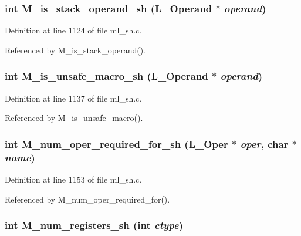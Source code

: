 \subsubsection{\setlength{\rightskip}{0pt plus 5cm}int M\_\-is\_\-stack\_\-operand\_\-sh (L\_\-Operand $\ast$ {\em operand})}\label{ml__sh_8c_88ed83827378c9bba80cda3d07304db6}




Definition at line 1124 of file ml\_\-sh.c.

Referenced by M\_\-is\_\-stack\_\-operand().
\subsubsection{\setlength{\rightskip}{0pt plus 5cm}int M\_\-is\_\-unsafe\_\-macro\_\-sh (L\_\-Operand $\ast$ {\em operand})}\label{ml__sh_8c_f997d65c0a0b45cbdd7b4cdd8093bc8c}




Definition at line 1137 of file ml\_\-sh.c.

Referenced by M\_\-is\_\-unsafe\_\-macro().
\subsubsection{\setlength{\rightskip}{0pt plus 5cm}int M\_\-num\_\-oper\_\-required\_\-for\_\-sh (L\_\-Oper $\ast$ {\em oper}, char $\ast$ {\em name})}\label{ml__sh_8c_ce5d1c89e44517211b2fbeaf36ad8a38}




Definition at line 1153 of file ml\_\-sh.c.

Referenced by M\_\-num\_\-oper\_\-required\_\-for().
\subsubsection{\setlength{\rightskip}{0pt plus 5cm}int M\_\-num\_\-registers\_\-sh (int {\em ctype})}\label{ml__sh_8c_9236ee4b265c482fbe59f1c30986ff8c}




